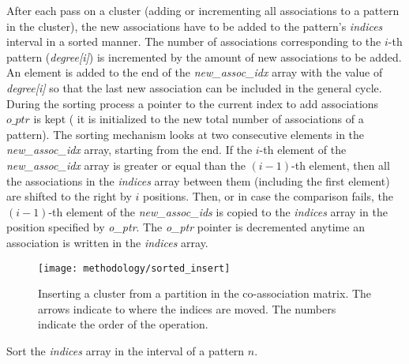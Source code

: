 After each pass on a cluster (adding or incrementing all associations to a pattern in the cluster), the new associations have to be added to the pattern's \emph{indices} interval in a sorted manner.
The number of associations corresponding to the $i$-th pattern (\emph{degree[i]}) is incremented by the amount of new associations to be added.
An element is added to the end of the \emph{new\_assoc\_idx} array with the value of \emph{degree[i]} so that the last new association can be included in the general cycle.
During the sorting process a pointer to the current index to add associations $o\_ptr$ is kept ( it is initialized to the new total number of associations of a pattern).
The sorting mechanism looks at two consecutive elements in the \emph{new\_assoc\_idx} array, starting from the end.
If the $i$-th element of the \emph{new\_assoc\_idx} array is greater or equal than the $(i-1)$-th element, then all the associations in the \emph{indices} array between them (including the first element) are shifted to the right by $i$ positions. %
Then, or in case the comparison fails, the $(i-1)$-th element of the \emph{new\_assoc\_ids} is copied to the \emph{indices} array in the position specified by \emph{o\_ptr}.
The \emph{o\_ptr} pointer is decremented anytime an association is written in the \emph{indices} array.

\begin{figure}[hbtp]
\centering
\texttt{[image: methodology/sorted\_insert]}
\caption{Inserting a cluster from a partition in the co-association matrix. The arrows indicate to where the indices are moved. The numbers indicate the order of the operation.}
\label{fig:normal part}
\end{figure}

\begin{algorithm}
\caption{Sort the \emph{indices} array in the interval of a pattern $n$.}\label{alg:eac csr sort cluster}
\begin{algorithmic}[1]

    \EndWhile
\EndWhile

\EndProcedure
\end{algorithmic}
\end{algorithm}

